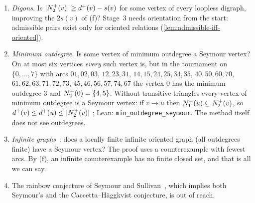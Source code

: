 \begin{enumerate}[label=(\alph*),leftmargin=2em,start=9]
$\sum_u\eta(u)\,d^+(u)\le\sum_u\eta(u)\abs{N^-_2(u)}$ in an Eulerian graph, the first
conjecture with an unknown weight in place of the uniform one.
\item \emph{Digons.} Is $\lvert N^+_2(v)\rvert\ge d^+(v)-s(v)$ for some vertex of every
loopless digraph, improving the $2s(v)$ of (f)? Stage~3 needs orientation from the
start: admissible pairs exist only for oriented relations
(\cref{lem:admissible-iff-oriented}).
\item \emph{Minimum outdegree.} Is some vertex of minimum outdegree a Seymour vertex?
On at most six vertices \emph{every} such vertex is, but in the tournament on
$\{0,\dots,7\}$ with arcs $01,02,03$, $12,23,31$, $14,15,24,25,34,35$,
$40,50,60,70$, $61,62,63,71,72,73$, $45,46,56,57,74,67$ the vertex $0$ has the minimum
outdegree $3$ and $N^+_2(0)=\{4,5\}$. Without transitive triangles every vertex of
minimum outdegree is a Seymour vertex: if $v\to u$ then $N^+_1(u)\subseteq N^+_2(v)$,
so $d^+(v)\le d^+(u)\le\lvert N^+_2(v)\rvert$
\cite[Theorem~3.2]{BrantnerBrockmanKaySnively2009}; Lean:
\texttt{min\_outdegree\_seymour}. The method itself does not see outdegrees.
\item \emph{Infinite graphs}~\cite[Conjecture~6.11]{Sullivan2006}: does a locally finite
infinite oriented graph (all outdegrees finite) have a Seymour vertex? The proof uses a
counterexample with fewest arcs. By (f), an infinite counterexample has no finite
closed set, and that is all we can say.
\item The rainbow conjecture of Seymour and Sullivan~\cite[Conjecture~6.1]{Sullivan2006},
which implies both Seymour's and the Caccetta--H\"aggkvist conjecture, is out of reach.
\end{enumerate}

